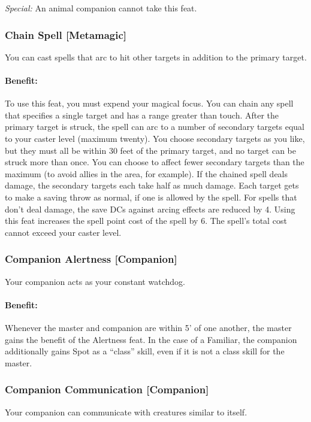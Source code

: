 \emph{Special:} An animal companion cannot take this feat.
\subsubsection[Chain Spell]{Chain Spell [Metamagic]}
\label{Feat:ChainSpell}
You can cast spells that arc to hit other targets in addition to the primary target. 

\paragraph{Benefit:} To use this feat, you must expend your magical focus. 
You can chain any spell that specifies a single target and has a range greater than touch. 
After the primary target is struck, the spell can arc to a number of secondary targets equal to your caster level (maximum twenty).
You choose secondary targets as you like, but they must all be within 30 feet of the primary target, and no target can be struck more than once. 
You can choose to affect fewer secondary targets than the maximum (to avoid allies in the area, for example).
If the chained spell deals damage, the secondary targets each take half as much damage. 
Each target gets to make a saving throw as normal, if one is allowed by the spell. 
For spells that don't deal damage, the save DCs against arcing effects are reduced by 4.
Using this feat increases the spell point cost of the spell by 6. The spell's total cost cannot exceed your caster level.
\subsubsection[Companion Alertness]{Companion Alertness [Companion]}
\label{Feat:CompanionAlertness}
Your companion acts as your constant watchdog.

\paragraph{Benefit:} Whenever the master and companion are within 5' of one another, the master gains the benefit of the Alertness feat.
In the case of a Familiar, the companion additionally gains Spot as a ``class'' skill, even if it is not a class skill for the master.
\subsubsection[Companion Communication]{Companion Communication [Companion]}
\label{Feat:CompanionCommunication}
Your companion can communicate with creatures similar to itself.

